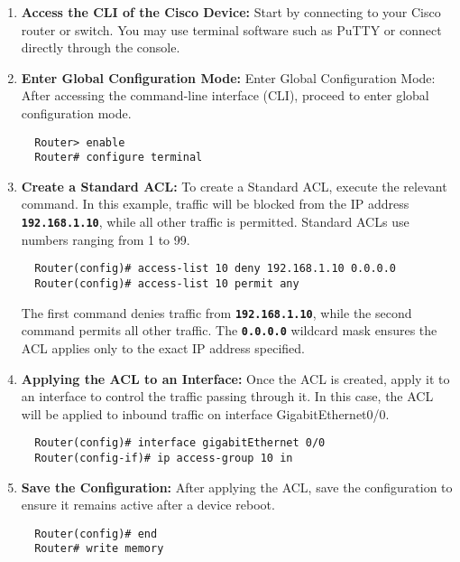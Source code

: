 \documentclass[11pt,a4paper]{article}
\begin{document}
        \begin{enumerate}
            \item \textbf{Access the CLI of the Cisco Device:} Start by connecting to your Cisco router or switch. You may use terminal software such as PuTTY or connect directly through the console.

            \item \textbf{Enter Global Configuration Mode:} Enter Global Configuration Mode: After accessing the command-line interface (CLI), proceed to enter global configuration mode.

\begin{lstlisting}
  Router> enable
  Router# configure terminal
\end{lstlisting}

            \item \textbf{Create a Standard ACL:} To create a Standard ACL, execute the relevant command. In this example, traffic will be blocked from the IP address \textbf{\lstinline{192.168.1.10}}, while all other traffic is permitted. Standard ACLs use numbers ranging from 1 to 99.
\begin{lstlisting}
  Router(config)# access-list 10 deny 192.168.1.10 0.0.0.0
  Router(config)# access-list 10 permit any
\end{lstlisting}
            The first command denies traffic from \textbf{\lstinline{192.168.1.10}}, while the second command permits all other traffic. The \textbf{\lstinline{0.0.0.0}} wildcard mask ensures the ACL applies only to the exact IP address specified.

            \item \textbf{Applying the ACL to an Interface:} Once the ACL is created, apply it to an interface to control the traffic passing through it. In this case, the ACL will be applied to inbound traffic on interface GigabitEthernet0/0.
\begin{lstlisting}
  Router(config)# interface gigabitEthernet 0/0
  Router(config-if)# ip access-group 10 in
\end{lstlisting}
            \item \textbf{Save the Configuration:} After applying the ACL, save the configuration to ensure it remains active after a device reboot.
\begin{lstlisting}
  Router(config)# end
  Router# write memory
\end{lstlisting}
        \end{enumerate}
    
\end{document}
